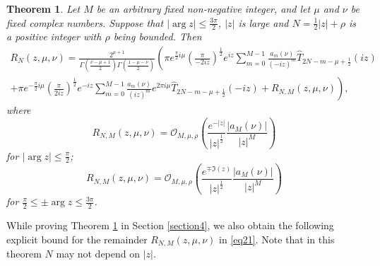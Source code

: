 \documentclass[a4paper,twoside,10pt]{amsart}
\newtheorem{theorem}{Theorem}[section]
\numberwithin{equation}{section}
\begin{document}
\begin{theorem}\label{thm2} Let $M$ be an arbitrary fixed non-negative integer, and let $\mu$ and $\nu$ be fixed complex numbers. Suppose that $\left|\arg z\right| \leq \frac{3\pi}{2}$, $\left|z\right|$ is large and $N = \frac{1}{2}\left|z\right|+\rho$ is a positive integer with $\rho$ being bounded. Then
\begin{multline}\label{eq21}
R_N \left( {z,\mu ,\nu } \right) = \frac{{2^{\mu  + 1} }}{{\Gamma \left( {\frac{{\nu  - \mu  + 1}}{2}} \right)\Gamma \left( {\frac{{1 - \mu  - \nu }}{2}} \right)}}\left( {\pi e^{\frac{\pi }{2}i\mu } \left( {\frac{\pi}{-2iz}} \right)^{\frac{1}{2}} e^{iz} \sum\limits_{m = 0}^{M - 1} {\frac{{a_m \left( \nu  \right)}}{{\left( {-iz} \right)^m }} \widehat T_{2N - m - \mu  + \frac{1}{2}} \left( {iz} \right)} }\right. \\ \left.{+ \pi e^{ - \frac{\pi }{2}i\mu } \left( {\frac{\pi }{{2iz }}} \right)^{\frac{1}{2}} e^{ - iz} \sum\limits_{m = 0}^{M - 1} {\frac{{a_m \left( \nu  \right)}}{{\left( {iz } \right)^m }}e^{2\pi i\mu } \widehat T_{2N - m - \mu  + \frac{1}{2}} \left( { - iz} \right)}  + R_{N,M} \left( {z,\mu ,\nu } \right)} \right),
\end{multline}
where
\[
R_{N,M} \left( {z,\mu ,\nu } \right) = \mathcal{O}_{M,\mu ,\rho } \left( {\frac{{e^{ - \left| z \right|} }}{{\left| z \right|^{\frac{1}{2}} }}\frac{{\left| {a_M \left( \nu  \right)} \right|}}{{\left| z \right|^M }}} \right)
\]
for $\left|\arg z\right| \leq \frac{\pi}{2}$;
\[
R_{N,M} \left( {z,\mu ,\nu } \right) = \mathcal{O}_{M,\mu ,\rho } \left( {\frac{{e^{ \mp \Im \left( z \right)} }}{{\left| z \right|^{\frac{1}{2}} }}\frac{{\left| {a_M \left( \nu  \right)} \right|}}{{\left| z \right|^M }}} \right)
\]
for $\frac{\pi }{2} \leq \pm \arg z \leq \frac{{3\pi }}{2}$.
\end{theorem}

While proving Theorem \ref{thm2} in Section \ref{section4}, we also obtain the following explicit bound for the remainder $R_{N,M} \left( {z,\mu ,\nu } \right)$ in \eqref{eq21}. Note that in this theorem $N$ may not depend on $\left|z\right|$.
\end{document}
